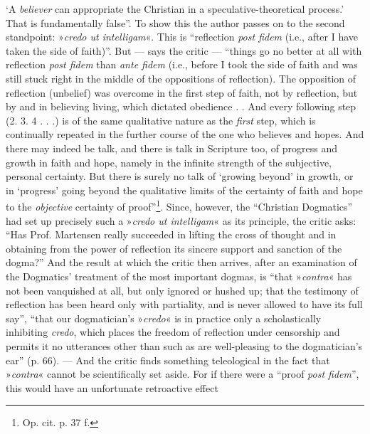 \documentclass[12pt,a4paper]{book}
\newcommand{\opage}[1]{\marginnote{\footnotesize\textit{[#1]}}}
\begin{document}
`A \emph{believer} can appropriate the Christian in a speculative-theoretical process.' That is fundamentally false''. To show this the author passes
\opage{29}\setcounter{footnote}{0}%
on to the second standpoint: »\emph{\textit{credo ut intelligam}}«. This is ``reflection \textit{post fidem} (i.e., after I have taken the side of faith)''. But --- says the critic --- ``things go no better at all with reflection \textit{post fidem} than \textit{ante fidem} (i.e., before I took the side of faith and was still stuck right in the middle of the oppositions of reflection). The opposition of reflection (unbelief) was overcome in the first step of faith, not by reflection, but by and in believing living, which dictated obedience . . And every following step (2. 3. 4 . . .) is of the same qualitative nature as the \emph{first} step, which is continually repeated in the further course of the one who believes and hopes. And there may indeed be talk, and there is talk in Scripture too, of progress and growth in faith and hope, namely in the infinite strength of the subjective, personal certainty. But there is surely no talk of `growing beyond' in growth, or in `progress' going beyond the qualitative limits of the certainty of faith and hope to the \emph{objective} certainty of proof''\footnote{Op. cit. p. 37 f.}. Since, however, the ``Christian Dogmatics'' had set up precisely such a »\textit{credo ut intelligam}« as its principle, the critic asks: ``Has Prof. Martensen really succeeded in lifting the cross of thought and in obtaining from the power of reflection its sincere support and sanction of the dogma?'' And the result at which the critic then arrives, after an examination of the Dogmatics' treatment of the most important dogmas, is ``that »\textit{contra}« has not been vanquished at all, but only ignored or hushed up; that the testimony of reflection has been heard only with partiality, and is never allowed to have its full say'', ``that our dogmatician's »\textit{credo}« is in practice only a scholastically inhibiting \textit{credo}, which places the freedom of reflection under censorship and permits it no utterances other than such as are well-pleasing to the dogmatician's ear'' (p. 66). ---
And the critic finds something teleological in the fact that »\textit{contra}« cannot be scientifically set aside. For if there were a ``proof \textit{post fidem}'', this would have an unfortunate retroactive effect
\end{document}

